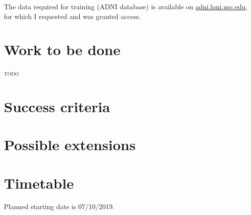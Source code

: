 \documentclass[12pt,a4paper,twoside]{article}
\begin{document}
The data required for training (ADNI database) is available on \url{adni.loni.usc.edu}, for which I requested and was granted access.

\section*{Work to be done}


\textsc{todo}

\section*{Success criteria}




\section*{Possible extensions}




\section*{Timetable}


Planned starting date is 07/10/2019.
\end{document}
